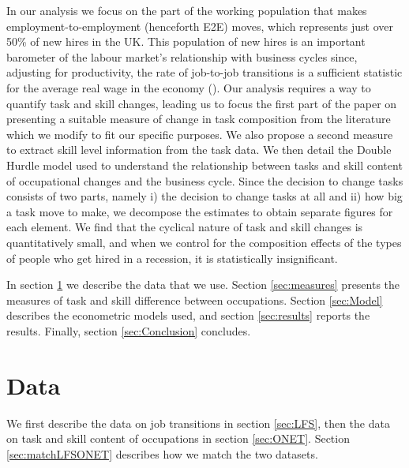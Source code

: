\documentclass[preprint,12pt,authoryear]{elsarticle}
\begin{document}
\vspace{2mm}

In our analysis we focus on the part of the working population that makes employment-to-employment (henceforth E2E) moves, which represents just over 50\% of new hires in the UK. This population of new hires is an important barometer of the labour market's relationship with  business cycles since, adjusting for productivity, the rate of job-to-job transitions is a sufficient statistic for the average real wage in the economy (\cite{MoscariniPostelVinay}). Our analysis requires a way to quantify task and skill changes, leading us to focus the first part of the paper on presenting a suitable measure of change in task composition from the literature which we modify to fit our specific purposes. We also propose a second measure to extract skill level information from the task data. We then detail the Double Hurdle model used to understand the relationship between tasks and skill content of occupational changes and the business cycle. Since the decision to change tasks consists of two parts, namely i) the decision to change tasks at all and ii) how big a task move to make, we decompose the estimates to obtain separate figures for each element. We find that the cyclical nature of task and skill changes is quantitatively small, and when we control for the composition effects of the types of people who get hired in a recession, it is statistically insignificant. 


\vspace{2mm}


In section \ref{sec:Data} we describe the data that we use. Section \ref{sec:measures} presents the measures of task and skill difference between occupations. Section \ref{sec:Model} describes the econometric models used, and section \ref{sec:results} reports the results. Finally, section \ref{sec:Conclusion} concludes.

	\section{Data}
\label{sec:Data}
We first describe the data on job transitions in section \ref{sec:LFS}, then the data on task and skill content of occupations in section \ref{sec:ONET}. Section \ref{sec:matchLFSONET} describes how we match the two datasets.
\end{document}
